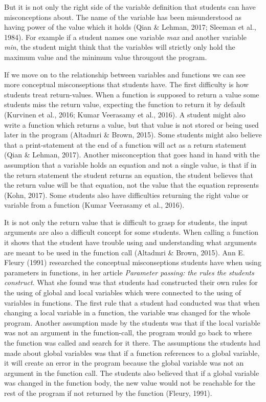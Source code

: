 \documentclass[twocolumn]{article}
\begin{document}
But it is not only the right side of the variable definition that students can have misconceptions about. The name of the variable has been misunderstood as having power of the value which it holds (Qian \& Lehman, 2017; Sleeman et al., 1984). For example if a student names one variable \emph{max} and another variable \emph{min}, the student might think that the variables will strictly only hold the maximum value and the minimum value througout the program. 

If we move on to the relationship between variables and functions we can see more conceptual misconseptions that students have. The first difficulty is how students treat return-values. When a function is supposed to return a value some students miss the return value, expecting the function to return it by default (Kurvinen et al., 2016; Kumar Veerasamy et al., 2016). A student might also write a function which returns a value, but that value is not stored or being used later in the program (Altadmri \& Brown, 2015). Some students might also believe that a print-statement at the end of a function will act as a return statement (Qian \& Lehman, 2017). Another misconception that goes hand in hand with the assumption that a variable holds an equation and not a single value, is that if in the return statement the student returns an equation, the student believes that the return value will be that equation, not the value that the equation represents (Kohn, 2017). Some students also have difficulties returning the right value or variable from a function (Kumar Veerasamy et al., 2016). 

It is not only the return value that is difficult to grasp for students, the input arguments are also a difficult concept for some students. When calling a function it shows that the student have trouble using and understanding what arguments are meant to be used in the function call (Altadmri \& Brown, 2015). Ann E. Fleury (1991) researched the conceptual misconseptions students have when using parameters in functions, in her article \emph{Parameter passing: the rules the students construct}. What she found was that students had constructed their own rules for the using of global and local variables which were connected to the using of variables in functions. The first rule that a student had conducted was that when changing a local variable in a function, the variable was changed for the whole program. Another assumption made by the students was that if the local variable was not an argument in the function-call, the program would go back to where the function was called and search for it there. The assumptions the students had made about global variables was that if a function references to a global variable, it will create an error in the program because the global variable was not an argument in the function call. The students also believed that if a global variable was changed in the function body, the new value would not be reachable for the rest of the program if not returned by the function (Fleury, 1991).
\end{document}
